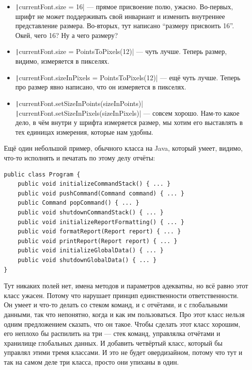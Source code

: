 \documentclass[a5paper]{article}
\begin{document}
\begin{itemize}
	\item \texttt|currentFont.size = 16| --- прямое присвоение полю, ужасно. Во-первых, шрифт не может поддерживать свой инвариант и изменить внутреннее представление размера. Во-вторых, тут написано ``размеру присвоить 16''. Окей, чего 16? Ну а чего размеру?
	\item \texttt|currentFont.size = PointsToPixels(12)| --- чуть лучше. Теперь размер, видимо, измеряется в пикселях.
	\item \texttt|currentFont.sizeInPixels = PointsToPixels(12)| --- ещё чуть лучше. Теперь про размер явно написано, что он измеряется в пикселях.
	\item \texttt|currentFont.setSizeInPoints(sizeInPoints)| \newline
			\texttt|currentFont.setSizeInPixels(sizeInPixels)| --- совсем хорошо. Нам-то какое дело, в чём внутри у шрифта измеряется размер, мы хотим его выставлять в тех единицах измерения, которые нам удобны.
\end{itemize}

Ещё один небольшой пример, обычного класса на Java, который умеет, видимо, что-то исполнять и печатать по этому делу отчёты:

\begin{verbatim}
public class Program {
    public void initializeCommandStack() { ... }
    public void pushCommand(Command command) { ... }
    public Command popCommand() { ... }
    public void shutdownCommandStack() { ... }
    public void initializeReportFormatting() { ... }
    public void formatReport(Report report) { ... }
    public void printReport(Report report) { ... }
    public void initializeGlobalData() { ... }
    public void shutdownGlobalData() { ... }
}
\end{verbatim}

Тут никаких полей нет, имена методов и параметров адекватны, но всё равно этот класс ужасен. Потому что нарушает принцип единственности ответственности. Он умеет и что-то делать со стеком команд, и с отчётами, и с глобальными данными, так что непонятно, когда и как им пользоваться. Про этот класс нельзя одним предложением сказать, что он такое. Чтобы сделать этот класс хорошим, его неплохо бы распилить на три --- стек команд, управлялка отчётами и хранилище глобальных данных. И добавить четвёртый класс, который бы управлял этими тремя классами. И это не будет овердизайном, потому что тут и так на самом деле три класса, просто они упиханы в один.
\end{document}
